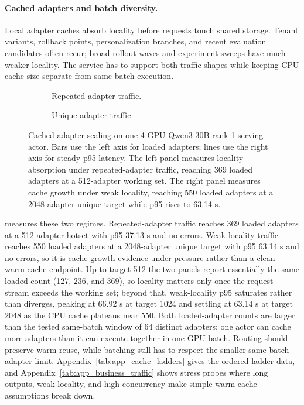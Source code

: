 \paragraph{Cached adapters and batch diversity.}
Local adapter caches absorb locality before requests touch shared storage. Tenant variants, rollback points, personalization branches, and recent evaluation candidates often recur; broad rollout waves and experiment sweeps have much weaker locality. The service has to support both traffic shapes while keeping CPU cache size separate from same-batch execution.

\begin{figure}[H]
    \centering
    \begin{subfigure}[t]{0.48\textwidth}
        \centering
        \resizebox{\linewidth}{!}{}
        \caption{Repeated-adapter traffic.}
        \label{fig:e4_hotset_ladder}
    \end{subfigure}\hfill
    \begin{subfigure}[t]{0.48\textwidth}
        \centering
        \resizebox{\linewidth}{!}{}
        \caption{Unique-adapter traffic.}
        \label{fig:e4_true_unique_frontier}
    \end{subfigure}
    \vspace{-10PT}
    \caption{Cached-adapter scaling on one 4-GPU Qwen3-30B rank-1 serving actor. Bars use the left axis for loaded adapters; lines use the right axis for steady p95 latency. The left panel measures locality absorption under repeated-adapter traffic, reaching 369 loaded adapters at a 512-adapter working set. The right panel measures cache growth under weak locality, reaching 550 loaded adapters at a 2048-adapter unique target while p95 rises to 63.14 s.}
    \vspace{-10PT}
    \label{fig:e4_cache_ladders}
\end{figure}

 measures these two regimes. Repeated-adapter traffic reaches 369 loaded adapters at a 512-adapter hotset with p95 37.13 s and no errors. Weak-locality traffic reaches 550 loaded adapters at a 2048-adapter unique target with p95 63.14 s and no errors, so it is cache-growth evidence under pressure rather than a clean warm-cache endpoint. Up to target 512 the two panels report essentially the same loaded count (127, 236, and 369), so locality matters only once the request stream exceeds the working set; beyond that, weak-locality p95 saturates rather than diverges, peaking at 66.92 s at target 1024 and settling at 63.14 s at target 2048 as the CPU cache plateaus near 550. Both loaded-adapter counts are larger than the tested same-batch window of 64 distinct adapters: one actor can cache more adapters than it can execute together in one GPU batch. Routing should preserve warm reuse, while batching still has to respect the smaller same-batch adapter limit. Appendix~\cref{tab:app_cache_ladders} gives the ordered ladder data, and Appendix~\cref{tab:app_business_traffic} shows stress probes where long outputs, weak locality, and high concurrency make simple warm-cache assumptions break down.

